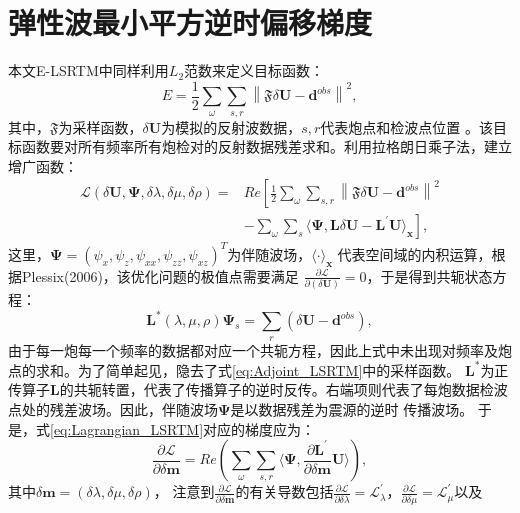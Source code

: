 \section{弹性波最小平方逆时偏移梯度}
本文E-LSRTM中同样利用$L_2$范数来定义目标函数：
\begin{equation}
    E=\frac{1}{2}\sum_{\omega}\sum_{s,r}\left\lVert \mathfrak{F}\delta \mathbf{U}-\mathbf{d}^{obs} \right \rVert^2,
    \label{eq:misfit_LSRTM}
\end{equation}
其中，$\mathfrak{F}$为采样函数，$\delta\mathbf{U}$为模拟的反射波数据，$s,r$代表炮点和检波点位置
。该目标函数要对所有频率所有炮检对的反射数据残差求和。利用拉格朗日乘子法，建立增广函数：
\begin{equation}
\begin{split}
    \mathcal{L}(\delta\mathbf{U},\bm\Psi,\delta\lambda,\delta\mu,\delta\rho)=&Re\left[
	\frac{1}{2}\sum_{\omega}\sum_{s,r}\left\lVert \mathfrak{F}\delta \mathbf{U}-\mathbf{d}^{obs} \right \rVert^2 \right. \\
	&\left.-\sum_{\omega}\sum_{s}\langle\bm\Psi,\mathbf{L}\delta\mathbf{U}-\mathbf{L}^{'}\mathbf{U}\rangle_{\mathbf{x}}\right],
    \label{eq:Lagrangian_LSRTM}
\end{split}
\end{equation}
这里，$\bm\Psi=(\psi_x,\psi_z,\psi_{xx},\psi_{zz},\psi_{xz})^T$为伴随波场，$\langle\cdot\rangle_\mathbf{x}$
代表空间域的内积运算，根据Plessix(2006)\cite{plessix2006}，该优化问题的极值点需要满足
$\frac{\partial\mathcal{L}}{\partial(\delta\mathbf{U})}=0$，于是得到共轭状态方程：
\begin{equation}
	\mathbf{L}^*(\lambda,\mu,\rho)\bm\Psi_s=\sum_{r}(\delta\mathbf{U}-\mathbf{d}^{obs}),
    \label{eq:Adjoint_LSRTM} 
\end{equation}
由于每一炮每一个频率的数据都对应一个共轭方程，因此上式中未出现对频率及炮点的求和。为了简单起见，隐去了式\eqref{eq:Adjoint_LSRTM}中的采样函数。
$\mathbf{L}^*$为正传算子$\mathbf{L}$的共轭转置，代表了传播算子的逆时反传。右端项则代表了每炮数据检波点处的残差波场。因此，伴随波场$\bm\Psi$是以数据残差为震源的逆时
传播波场。
于是，式\eqref{eq:Lagrangian_LSRTM}对应的梯度应为：
\begin{equation}
    \frac{\partial\mathcal{L}}{\partial \delta\mathbf{m}}=Re\left(\sum_{\omega}\sum_{s,r}
	\langle\bm\Psi,\frac{\partial \mathbf{L}^{'}}{\partial\delta\mathbf{m}}\mathbf{U}\rangle\right),
    \label{eq:Gradient_LSRTM}
\end{equation}
其中$\delta\mathbf{m}=(\delta\lambda, \delta\mu,\delta\rho)$，
注意到$\frac{\partial\mathcal{L}}{\partial \delta\mathbf{m}}$的有关导数包括$\frac{\partial\mathcal{L}}{\partial 
\delta\lambda}=\mathcal{L}^{'}_{\lambda}$，$\frac{\partial\mathcal{L}}{\partial\delta\mu}=\mathcal{L}^{'}_{\mu}$以及
